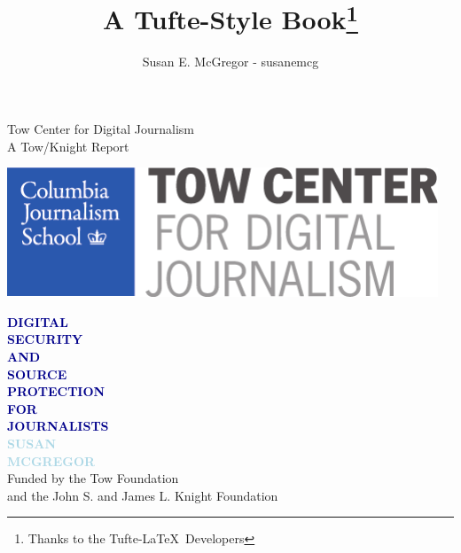 \documentclass{tufte-book}
\title{A Tufte-Style Book\thanks{Thanks to the Tufte-LaTeX\ Developers}}
\author{Susan E. McGregor - susanemcg}
\newcommand{\blankpage}{\newpage\hbox{}\thispagestyle{empty}\newpage}
\begin{document}
\frontmatter

\blankpage



\begin{minipage}[t][1\textheight]{0.40\textwidth}
\vspace{0pt}
\begin{flushleft}
\small\textsf{Tow Center for Digital Journalism\\
A Tow/Knight Report}
\end{flushleft}
\vfill
\includegraphics[width=.4\textwidth]{graphics/ColumbiaLogo.pdf}
\end{minipage}%
\hfill
\begin{minipage}[t][1\textheight]{70mm}
\vspace{0pt}
\Huge\textcolor{darkblue}{\textbf{{\titlefont DIGITAL\\ SECURITY\\
AND\\
SOURCE\\ PROTECTION\\
FOR\\
JOURNALISTS\\
\textcolor{lightblue}{
SUSAN\\
MCGREGOR\\
}
}
}}
\vfill
\small\textsf{Funded by the Tow Foundation\\
and the John S. and James L. Knight Foundation}
\end{minipage}%
\end{document}

